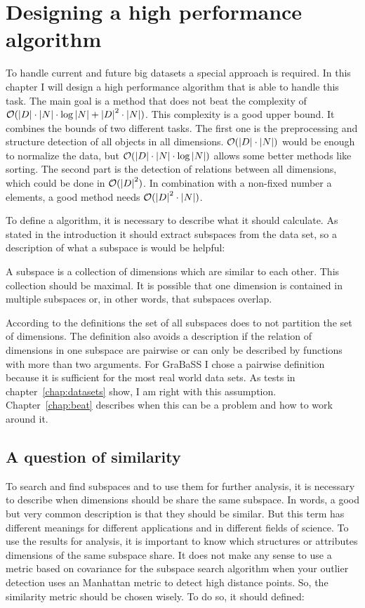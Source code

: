 \chapter{Designing a high performance algorithm}\label{chap:algodesign}
To handle current and future big datasets a special approach is required. In this chapter I will design a high performance algorithm that is able to handle this task. The main goal is a method that does not beat the complexity of $\mathcal{O} ( \left|D\right| \cdot \left|N\right| \cdot \log{\left|N\right|} + \left|D\right|^2 \cdot \left|N\right| )$. This complexity is a good upper bound. It combines the bounds of two different tasks. The first one is the preprocessing and structure detection of all objects in all dimensions. $\mathcal{O} ( \left|D\right| \cdot \left|N\right| )$ would be enough to normalize the data, but $\mathcal{O} ( \left|D\right| \cdot \left|N\right| \cdot \log{\left|N\right|} )$ allows some better methods like sorting. The second part is the detection of relations between all dimensions, which could be done in $\mathcal{O} ( \left|D\right|^2 )$. In combination with a non-fixed number a elements, a good method needs $\mathcal{O} ( \left|D\right|^2 \cdot \left|N\right| )$.

To define a algorithm, it is necessary to describe what it should calculate. As stated in the introduction it should extract subspaces from the data set, so a description of what a subspace is would be helpful:
\begin{envdef}[Subspace]
	A subspace is a collection of dimensions which are similar to each other. This collection should be maximal. It is possible that one dimension is contained in multiple subspaces or, in other words, that subspaces overlap.
\end{envdef}

According to the definitions the set of all subspaces does to not partition the set of dimensions. The definition also avoids a description if the relation of dimensions in one subspace are pairwise or can only be described by functions with more than two arguments. For GraBaSS I chose a pairwise definition because it is sufficient for the most real world data sets. As tests in chapter~\ref{chap:datasets} show, I am right with this assumption. Chapter~\ref{chap:beat} describes when this can be a problem and how to work around it.

\section{A question of similarity}
To search and find subspaces and to use them for further analysis, it is necessary to describe when dimensions should be share the same subspace. In words, a good but very common description is that they should be similar. But this term has different meanings for different applications and in different fields of science. To use the results for analysis, it is important to know which structures or attributes dimensions of the same subspace share. It does not make any sense to use a metric based on covariance for the subspace search algorithm when your outlier detection uses an Manhattan metric to detect high distance points. So, the similarity metric should be chosen wisely. To do so, it should defined:

